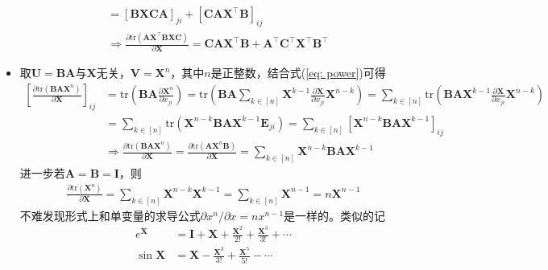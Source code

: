 \documentclass{ctexart}
\theoremstyle{definition}
\def \Av {\mathbf{A}}
\def \Bv {\mathbf{B}}
\def \Cv {\mathbf{C}}
\def \Ev {\mathbf{E}}
\def \Iv {\mathbf{I}}
\def \Uv {\mathbf{U}}
\def \Vv {\mathbf{V}}
\def \Xv {\mathbf{X}}
\def \tr {\mathrm{tr}}
\begin{document}
\begin{itemize}
\begin{align*}
                                                                                              & = [\Bv \Xv \Cv \Av]_{ji} + [\Cv \Av \Xv^\top \Bv]_{ij}                                                                                                        \\
                                                                                              & \Longrightarrow \frac{\partial \tr(\Av \Xv^\top \Bv \Xv \Cv)}{\partial \Xv} = \Cv \Av \Xv^\top \Bv + \Av^\top \Cv^\top \Xv^\top \Bv^\top
          \end{align*}
    \item 取$\Uv = \Bv \Av$与$\Xv$无关，$\Vv = \Xv^n$，其中$n$是正整数，结合式(\ref{eq: power})可得
          \begin{align*}
              \left[ \frac{\partial \tr(\Bv \Av \Xv^n)}{\partial \Xv} \right]_{ij} & = \tr \left( \Bv \Av \frac{\partial \Xv^n}{\partial x_{ji}} \right) = \tr \left( \Bv \Av \sum_{k \in [n]} \Xv^{k-1} \frac{\partial \Xv}{\partial x_{ji}} \Xv^{n-k} \right) = \sum_{k \in [n]} \tr \left( \Bv \Av \Xv^{k-1} \frac{\partial \Xv}{\partial x_{ji}} \Xv^{n-k} \right) \\
                                                                                   & = \sum_{k \in [n]} \tr ( \Xv^{n-k} \Bv \Av \Xv^{k-1} \Ev_{ji} ) = \sum_{k \in [n]} [\Xv^{n-k} \Bv \Av \Xv^{k-1}]_{ij}                                                                                                                                                             \\
                                                                                   & \Longrightarrow \frac{\partial \tr(\Bv \Av \Xv^n)}{\partial \Xv} = \frac{\partial \tr(\Av \Xv^n \Bv)}{\partial \Xv} = \sum_{k \in [n]} \Xv^{n-k} \Bv \Av \Xv^{k-1}
          \end{align*}
          进一步若$\Av = \Bv = \Iv$，则
          \begin{align*}
              \frac{\partial \tr(\Xv^n)}{\partial \Xv} = \sum_{k \in [n]} \Xv^{n-k} \Xv^{k-1} = \sum_{k \in [n]} \Xv^{n-1} = n \Xv^{n-1}
          \end{align*}
          不难发现形式上和单变量的求导公式$\partial x^n / \partial x = n x^{n-1}$是一样的。类似的记
          \begin{align*}
              e^{\Xv}  & = \Iv + \Xv + \frac{\Xv^2}{2!} + \frac{\Xv^3}{3!} + \cdots              \\
              \sin \Xv & = \Xv - \frac{\Xv^3}{3!} + \frac{\Xv^5}{5!} - \cdots                    \\

\end{align*}
\end{itemize}
\end{document}
